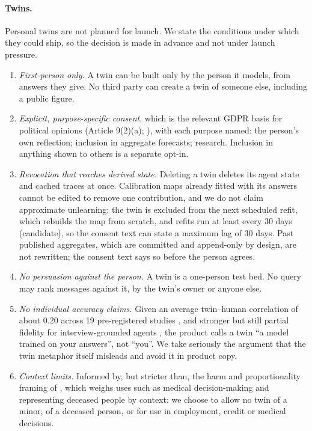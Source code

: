 \documentclass[11pt]{article}
\begin{document}
\paragraph{Twins.} Personal twins are not planned for launch. We state the conditions under which they could ship, so the decision is made in advance and not under launch pressure.
\begin{enumerate}
  \item \emph{First-person only.} A twin can be built only by the person it models, from answers they give. No third party can create a twin of someone else, including a public figure.
  \item \emph{Explicit, purpose-specific consent}, which is the relevant GDPR basis for political opinions (Article 9(2)(a); \citealp{gdpr2016}), with each purpose named: the person's own reflection; inclusion in aggregate forecasts; research. Inclusion in anything shown to others is a separate opt-in.
  \item \emph{Revocation that reaches derived state.} Deleting a twin deletes its agent state and cached traces at once. Calibration maps already fitted with its answers cannot be edited to remove one contribution, and we do not claim approximate unlearning: the twin is excluded from the next scheduled refit, which rebuilds the map from scratch, and refits run at least every 30 days (candidate), so the consent text can state a maximum lag of 30 days. Past published aggregates, which are committed and append-only by design, are not rewritten; the consent text says so before the person agrees.
  \item \emph{No persuasion against the person.} A twin is a one-person test bed. No query may rank messages against it, by the twin's owner or anyone else.
  \item \emph{No individual accuracy claims.} Given an average twin--human correlation of about 0.20 across 19 pre-registered studies \citep{peng2025funhouse}, and stronger but still partial fidelity for interview-grounded agents \citep{park2024selfreports}, the product calls a twin ``a model trained on your answers'', not ``you''. We take seriously the argument that the twin metaphor itself misleads \citep{annoni2026metaphor} and avoid it in product copy.
  \item \emph{Context limits.} Informed by, but stricter than, the harm and proportionality framing of \citet{hurshman2026duplicates}, which weighs uses such as medical decision-making and representing deceased people by context: we choose to allow no twin of a minor, of a deceased person, or for use in employment, credit or medical decisions.
\end{enumerate}
\end{document}
